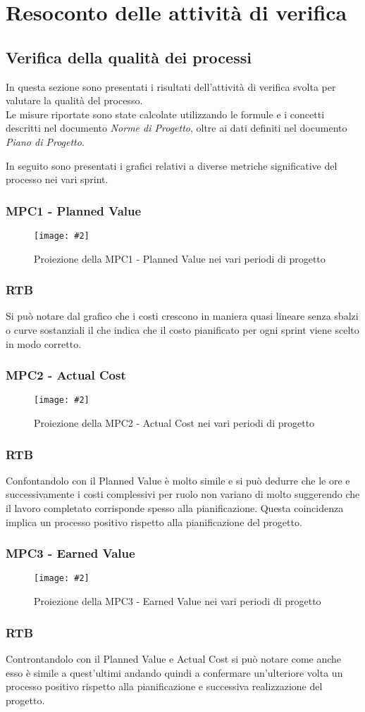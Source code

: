 \newcommand{\Met}[3]{
    \subsubsection{#1}
    \begin{figure}[h!] \centering
        \texttt{[image: \#2]}
        \caption{Proiezione della#1nei vari periodi di progetto}
    \end{figure}
    \subsubsection*{RTB}
    #3
    \newpage
}

\section{Resoconto delle attività di verifica}

\subsection{Verifica della qualità dei processi}
In questa sezione sono presentati i risultati dell'attività di verifica svolta per valutare la qualità del processo.\\
Le misure riportate sono state calcolate utilizzando le formule e i concetti descritti nel documento \textit{Norme di Progetto}, oltre ai dati definiti nel documento \textit{Piano di Progetto}.

In seguito sono presentati i grafici relativi a diverse metriche significative del processo nei vari sprint.

\Met
{ %
    MPC1 - Planned Value
}
{ %
    template/images/PV.png
}
{ %
    Si può notare dal grafico che i costi crescono in maniera quasi lineare senza sbalzi o curve sostanziali
    il che indica che il costo pianificato per ogni sprint viene scelto in modo corretto.
}

\Met
{ %
    MPC2 - Actual Cost
}
{ %
    template/images/AC.png
}
{ %
    Confontandolo con il Planned Value è molto simile e si può dedurre che le ore e successivamente i costi complessivi
    per ruolo non variano di molto suggerendo che il lavoro completato corrisponde spesso alla pianificazione.
    Questa coincidenza implica un processo positivo rispetto alla pianificazione del progetto.
}

\Met
{ %
    MPC3 - Earned Value
}
{ %
    template/images/EV.png
}
{ %
    Controntandolo con il Planned Value e Actual Cost si può notare come anche esso è simile a quest'ultimi 
    andando quindi a confermare un'ulteriore volta un processo positivo  rispetto alla pianificazione e successiva realizzazione del progetto.
}

